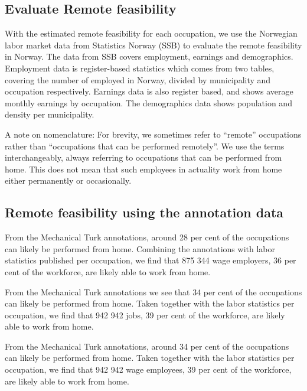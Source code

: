 \documentclass[11pt,]{article}
\begin{document}
\hypertarget{evaluate-remote-feasibility}{%
\subsection{Evaluate Remote
feasibility}\label{evaluate-remote-feasibility}}

With the estimated remote feasibility for each occupation, we use the
Norwegian labor market data from Statistics Norway (SSB) to evaluate the
remote feasibility in Norway. The data from SSB covers employment,
earnings and demographics. Employment data is register-based statistics
which comes from two tables, covering the number of employed in Norway,
divided by municipality and occupation respectively. Earnings data is
also register based, and shows average monthly earnings by occupation.
The demographics data shows population and density per municipality.

A note on nomenclature: For brevity, we sometimes refer to ``remote''
occupations rather than ``occupations that can be performed remotely''.
We use the terms interchangeably, always referring to occupations that
can be performed from home. This does not mean that such employees in
actuality work from home either permanently or occasionally.

\hypertarget{remote-feasibility-using-the-annotation-data}{%
\subsection{Remote feasibility using the annotation
data}\label{remote-feasibility-using-the-annotation-data}}

From the Mechanical Turk annotations, around 28 per cent of the
occupations can likely be performed from home. Combining the annotations
with labor statistics published per occupation, we find that 875 344
wage employers, 36 per cent of the workforce, are likely able to work
from home.

From the Mechanical Turk annotations we see that 34 per cent of the
occupations can likely be performed from home. Taken together with the
labor statistics per occupation, we find that 942 942 jobs, 39 per cent
of the workforce, are likely able to work from home.

From the Mechanical Turk annotations, around 34 per cent of the
occupations can likely be performed from home. Taken together with the
labor statistics per occupation, we find that 942 942 wage employees, 39
per cent of the workforce, are likely able to work from home.
\end{document}
